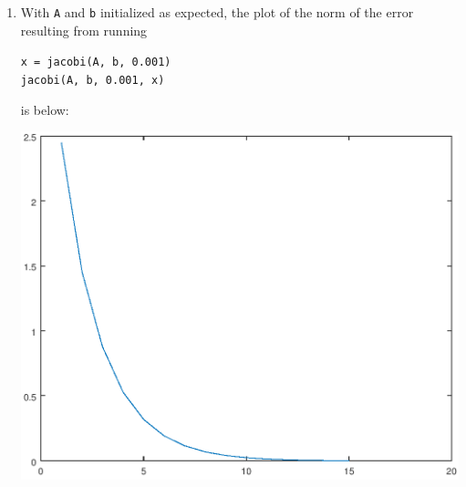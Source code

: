 \documentclass[a4paper,12pt]{article}
\begin{document}
\begin{enumerate}
\begin{gather*}
\begin{array}{cccccc}
                    \vdots & \vdots & 0 & \ddots & \ddots & 0 \\
                    \vdots & \vdots & \vdots & \ddots & \ddots & -1 \\
                    0 & 0 & \cdots & \cdots & 0 & \frac{n + 1}{n}
            \end{array} \right] = LU
        \end{gather*}
        Verification: \\
        $A_{i, i} = \sum_{k = 1}^n L_{i, k} U_{k, i} = (-\frac{i - 1}{i})(-1) + \frac{i + 1}{i} = \frac{i - 1}{i} + \frac{i + 1}{i} = \frac{2i}{i} = 2$ for all $1 \leq i \leq n$, \\
        $A_{i - 1, i} = \sum_{k = 1}^n L_{i - 1, k} U_{k, i} = 1(-1) = -1$ for all $2 \leq i \leq n$, \\
        $A_{i, i - 1} = \sum_{k = 1}^n L_{i, k} U_{k, i - 1} = -\frac{i - 1}{i} \frac{i}{i - 1} = -1$ for all $2 \leq i \leq n$, \\
        $A_{i, j} = 0$ for all $|i - j| > 1$. \par
        Thus, $A_n = LU$ is the correct factorization.

    \item
        With \texttt{A} and \texttt{b} initialized as expected, the plot of the norm of the error resulting from running
        \begin{center}
            \texttt{x = jacobi(A, b, 0.001)} \\
            \texttt{jacobi(A, b, 0.001, x)} \\
        \end{center}
        is below:
        \begin{center}
            \includegraphics[scale=0.25]{jacobi_error}
        \end{center}


\end{enumerate}
\end{document}
